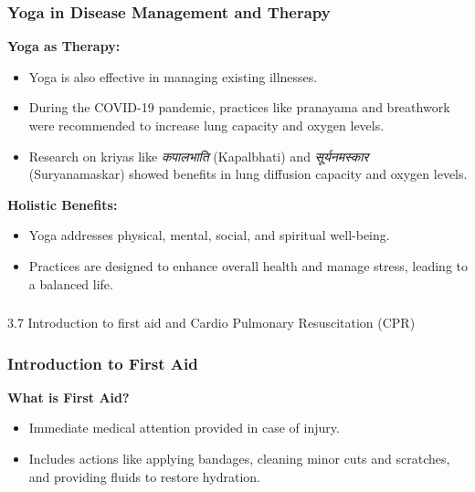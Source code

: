 \begin{frame}[fragile]\frametitle{Yoga in Disease Management and Therapy}
    \textbf{Yoga as Therapy:}
    \begin{itemize}
        \item Yoga is also effective in managing existing illnesses.
        \item During the COVID-19 pandemic, practices like pranayama and breathwork were recommended to increase lung capacity and oxygen levels.
        \item Research on kriyas like \textit{कपालभाति} (Kapalbhati) and \textit{सूर्यनमस्कार} (Suryanamaskar) showed benefits in lung diffusion capacity and oxygen levels.
    \end{itemize}

    \textbf{Holistic Benefits:}
    \begin{itemize}
        \item Yoga addresses physical, mental, social, and spiritual well-being.
        \item Practices are designed to enhance overall health and manage stress, leading to a balanced life.
    \end{itemize}
\end{frame}

\begin{frame}[fragile]\frametitle{}
\begin{center}
{\Large 3.7 Introduction to ﬁrst aid and Cardio Pulmonary Resuscitation (CPR)}
\end{center}
\end{frame}

\begin{frame}[fragile]\frametitle{Introduction to First Aid}
    \textbf{What is First Aid?}
    \begin{itemize}
        \item Immediate medical attention provided in case of injury.
        \item Includes actions like applying bandages, cleaning minor cuts and scratches, and providing fluids to restore hydration.
    \end{itemize}
\end{frame}


